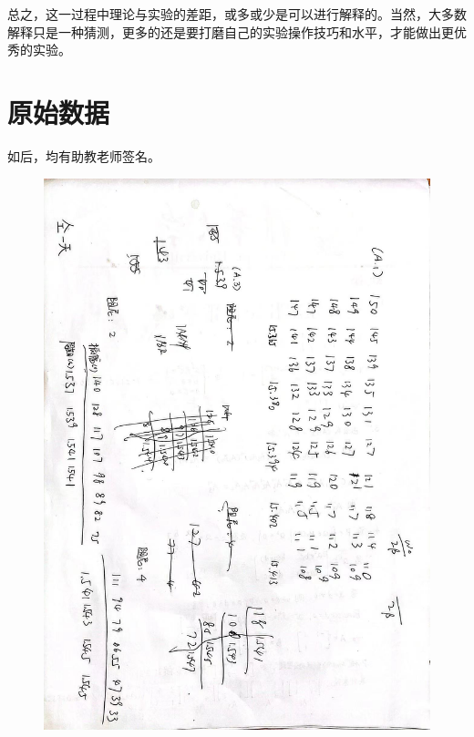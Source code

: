 \documentclass[11pt,a4paper,UTF8]{ctexart}
\begin{document}
总之，这一过程中理论与实验的差距，或多或少是可以进行解释的。当然，大多数解释只是一种猜测，更多的还是要打磨自己的实验操作技巧和水平，才能做出更优秀的实验。

\section{原始数据}

如后，均有助教老师签名。

\begin{figure}[h]
	\centering
	\includegraphics[width=.95\linewidth]{原始数据1.jpg}
\end{figure}
\end{document}
